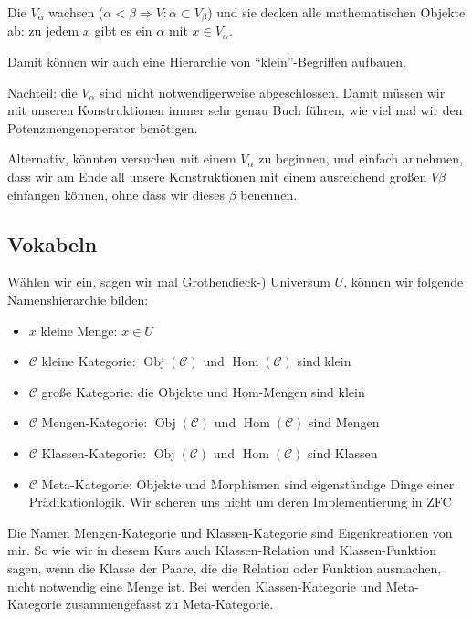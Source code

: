 \documentclass[a4paper]{amsart}
\theoremstyle{definition}
\DeclareMathOperator{\Hom}{Hom}
\newcommand{\CC}{\ensuremath{\mathcal{ C }}}
\begin{document}
Die $V_\alpha$ wachsen ($\alpha < \beta \Rightarrow V:\alpha \subset V_\beta$) und sie decken alle mathematischen Objekte ab: zu jedem $x$ gibt es ein $\alpha$ mit $x \in V_\alpha$.

Damit können wir auch eine Hierarchie von "`klein"'-Begriffen aufbauen.

Nachteil: die $V_\alpha$ sind nicht notwendigerweise abgeschlossen. Damit müssen wir mit unseren Konstruktionen immer sehr genau Buch führen, wie viel mal wir den Potenzmengenoperator benötigen.

Alternativ, könnten versuchen mit einem $V_\alpha$ zu beginnen, und einfach annehmen, dass wir am Ende all unsere Konstruktionen mit einem ausreichend großen $V\beta$ einfangen können, ohne dass wir dieses $\beta$ benennen.

\subsection{Vokabeln}
Wählen wir ein, sagen wir mal Grothendieck-) Universum $U$, können wir folgende Namenshierarchie bilden:
\begin{itemize}
   \item $x$ kleine Menge: $x \in U$
   \item $\CC$ kleine Kategorie: $\operatorname{Obj}(\CC)$ und $\Hom(\CC)$ sind klein
   \item $\CC$ große Kategorie: die Objekte und Hom-Mengen sind klein
   \item $\CC$ Mengen-Kategorie: $\operatorname{Obj}(\CC)$ und $\Hom(\CC)$ sind Mengen 
   \item $\CC$ Klassen-Kategorie: $\operatorname{Obj}(\CC)$ und $\Hom(\CC)$ sind Klassen
   \item $\CC$ Meta-Kategorie: Objekte und Morphismen sind eigenständige Dinge einer Prädikationlogik. Wir scheren uns nicht um deren Implementierung in ZFC
\end{itemize}
Die Namen Mengen-Kategorie und Klassen-Kategorie sind Eigenkreationen von mir. So wie wir in diesem Kurs auch Klassen-Relation und Klassen-Funktion sagen, wenn die Klasse der Paare, die die Relation oder Funktion ausmachen, nicht notwendig eine Menge ist. Bei \cite{MacLane} werden Klassen-Kategorie und Meta-Kategorie zusammengefasst zu Meta-Kategorie.
\end{document}
